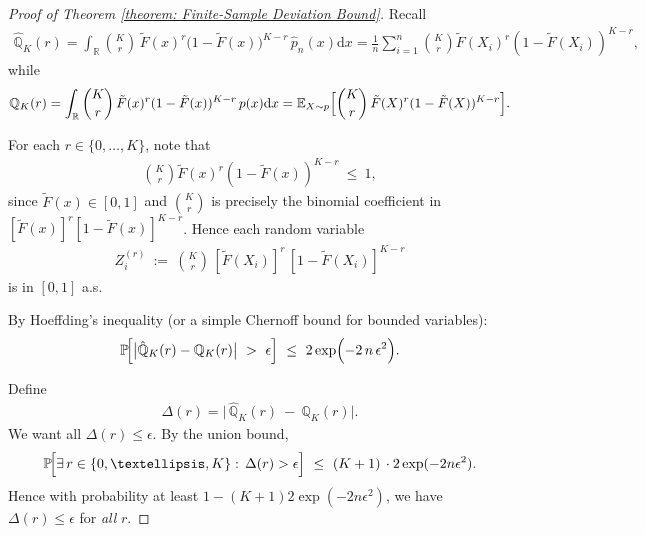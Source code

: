 \documentclass[10pt,a4paper]{amsart}
\begin{document}
\begin{proof}[Proof of Theorem \ref{theorem: Finite-Sample Deviation Bound}]
Recall
\begin{align*}
\hat{\mathbb{Q}}_K(r)
=
\int_{\mathbb{R}}
  \binom{K}{r}\,
  \tilde{F}(x)^r(1 - \tilde{F}(x)\bigr)^{K-r}
\,\hat{p}_n(x)\mathrm{d}x
=
\frac{1}{n} \sum_{i=1}^{n}
  \binom{K}{r}
  \tilde{F}(X_i)^r
  (1-\tilde{F}(X_i))^{K-r},
\end{align*}
while
\begin{align*}
\mathbb{Q}_{K}(r)=
\int_{\mathbb{R}}
  \binom{K}{r}\,
  \tilde{F}(x)^{r}(1-\tilde{F}(x))^{K-r}
\,p(x)\mathrm{d}x
=
\mathbb{E}_{X \sim p}\Bigl[
  \binom{K}{r}\,\tilde{F}(X)^r(1-\tilde{F}(X))^{K-r}
\Bigr].
\end{align*}

For each $r \in \{0,\ldots,K\}$, note that 
\begin{align*}
\binom{K}{r}\tilde{F}(x)^r (1 - \tilde{F}(x))^{K-r}
~\le~
1,
\end{align*}
since $\tilde{F}(x)\in [0,1]$ and $\binom{K}{r}$ is precisely the binomial coefficient in $[\tilde{F}(x)]^r[1-\tilde{F}(x)]^{K-r}$.  
Hence each random variable
\begin{align*}
Z_i^{(r)}
~:=~
\binom{K}{r}\,
[\tilde{F}(X_i)]^r\,
[1 - \tilde{F}(X_i)]^{K-r}
\end{align*}
is in $[0,1]$ a.s.

By Hoeffding's inequality (or a simple Chernoff bound for bounded variables):
\begin{align*}
\mathbb{P}\!\Bigl[
  \bigl|\hat{\mathbb{Q}}_K(r) - \mathbb{Q}_K(r)\bigr|
  ~>~
  \epsilon
\Bigr]
~\le~
2\exp\Bigl(
  -2\,n\,\epsilon^2
\Bigr).
\end{align*}

Define
\begin{align*}
\Delta(r)=
\bigl|\,
  \hat{\mathbb{Q}}_K(r)
  ~-~
  \mathbb{Q}_K(r)
\bigr|.
\end{align*}
We want all $\Delta(r)\le \epsilon$. By the union bound,
\begin{align*}
\mathbb{P}\!\Bigl[
  \exists\,r\in \{0,\ldots,K\}:\,\Delta(r) > \epsilon
\Bigr]
~\le~
(K+1)\,\cdot 2\exp(-2n\epsilon^2).
\end{align*}
Hence with probability at least $1-(K+1)2\exp(-2n\epsilon^2)$, we have $\Delta(r)\le \epsilon$ for \emph{all} $r$.  


\end{proof}
\end{document}
